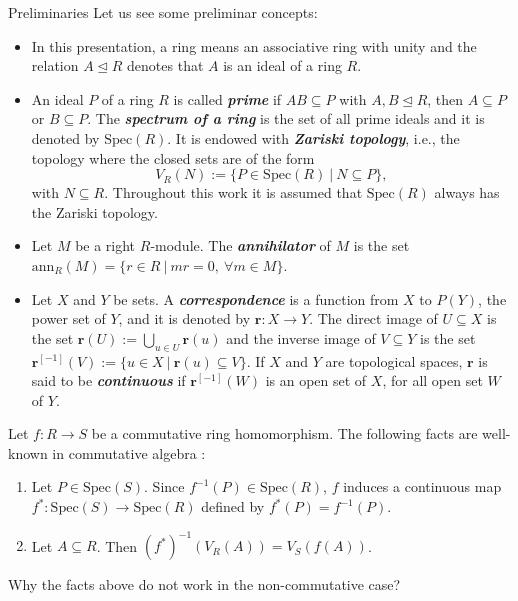 \documentclass[final]{beamer}
\newlength{\colwidth}
\newcommand{\ideal}{\trianglelefteq}
\newcommand{\spec}{\mathrm{Spec}}
\newcommand{\defi}[1]{\textbf{\textsl{#1}}}
\newcommand{\ann}{\mathrm{ann}}
\begin{document}
\begin{frame}[t, fragile]
\begin{columns}[t]
\begin{column}{\colwidth}
\begin{block}{Preliminaries}
    Let us see some preliminar concepts:
    \begin{itemize}
        \item In this presentation, a ring means an associative ring with unity and the relation $A\ideal R$ denotes that $A$ is an ideal of a ring $R$.
        \item An ideal $P$ of a ring $R$ is called \defi{prime} if $AB\subseteq P$ with $A,B\ideal R$, then $A\subseteq P$ or $B\subseteq P$. The \defi{spectrum of a ring} is the set of all prime ideals and it is denoted by $\spec(R)$. It is endowed with \defi{Zariski topology}, i.e., the topology where the closed sets are of the form
        \begin{equation*}
            V_R(N):=\{P\in\spec(R)~|~N\subseteq P\},
        \end{equation*}
        with $N\subseteq R$. Throughout this work it is assumed that $\spec(R)$ always has the Zariski topology.
        \item Let $M$ be a right $R$-module. The \defi{annihilator} of $M$ is the set $\ann_R(M)=\{r\in R~|~mr=0,~\forall m\in M\}$.
        \item Let $X$ and $Y$ be sets. A \defi{correspondence} is a function from $X$ to $P(Y)$, the power set of $Y$, and it is denoted by $\mathbf{r}:X\to Y$. The direct image of $U\subseteq X$ is the set $\mathbf{r}(U):=\bigcup_{u\in U}\mathbf{r}(u)$ and the inverse image of $V\subseteq Y$ is the set $\mathbf{r}^{[-1]}(V):=\{u\in X~|~ \mathbf{r}(u)\subseteq V\}$. If $X$ and $Y$ are topological spaces, $\mathbf{r}$ is said to be \defi{continuous} if $\mathbf{r}^{[-1]}(W)$ is an open set of $X$, for all open set $W$ of $Y$.
    \end{itemize}
    Let $f:R\to S$ be a commutative ring homomorphism. The following facts are well-known in commutative algebra \textbf{\cite{atiyah1994introduction}}: 
    \begin{enumerate}
        \item Let $P\in\spec(S)$. Since $f^{-1}(P)\in\spec(R)$, $f$ induces a continuous map $f^*:\spec(S)\to\spec(R)$ defined by $f^*(P)=f^{-1}(P)$.
        \item Let $A\subseteq R$. Then $(f^*)^{-1}(V_R(A))=V_S(f(A))$.
    \end{enumerate} 
  \end{block}
    
  \begin{alertblock}{Why the facts above do not work in the non-commutative case?}


\end{alertblock}
\end{column}
\end{columns}
\end{frame}
\end{document}
